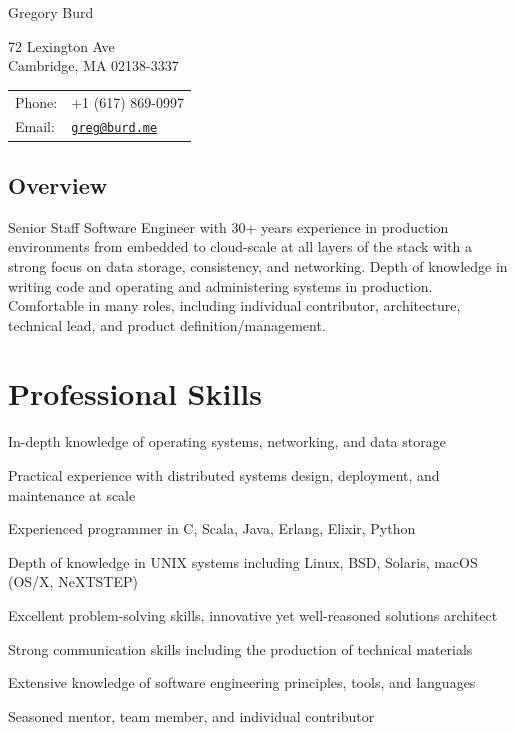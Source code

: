 \documentclass[letterpaper]{article}
\def\name{Gregory Burd}
\renewenvironment{itemize}{
  \begin{list}{}{
    \setlength{\leftmargin}{1.5em}
  }
}{
  \end{list}
}
\begin{document}
{\huge \name}


\vspace{0.25in}

\begin{minipage}{0.45\linewidth}
  72 Lexington Ave \\
  Cambridge, MA 02138-3337
\end{minipage}
\begin{minipage}{0.45\linewidth}
  \begin{tabular}{ll}
    Phone: & +1 (617) 869-0997 \\
    Email: & \href{mailto:greg@burd.me}{\tt greg@burd.me} \\
  \end{tabular}
\end{minipage}

\vspace{0.25in}

\subsection*{Overview}

Senior Staff Software Engineer with 30+ years experience in production environments from
embedded to cloud-scale at all layers of the stack with a strong focus on data storage,
consistency, and networking.  Depth of knowledge in writing code and operating and
administering systems in production.  Comfortable in many roles, including
individual contributor, architecture, technical lead, and product definition/management.

\section*{Professional Skills}

\begin{itemize}
\item In-depth knowledge of operating systems, networking, and data storage
\item Practical experience with distributed systems design, deployment, and maintenance at scale
\item Experienced programmer in C, Scala, Java, Erlang, Elixir, Python
\item Depth of knowledge in UNIX systems including Linux, BSD, Solaris, macOS (OS/X, NeXTSTEP)
\item Excellent problem-solving skills, innovative yet well-reasoned solutions architect
\item Strong communication skills including the production of technical materials
\item Extensive knowledge of software engineering principles, tools, and languages
\item Seasoned mentor, team member, and individual contributor
\end{itemize}
\end{document}
